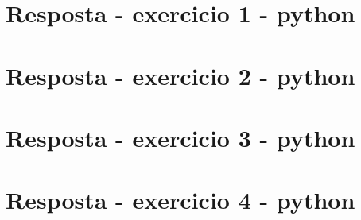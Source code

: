 \documentclass{article}
\begin{document}
\newpage
\section{Resposta - exercicio 1 - python}



\newpage

\section{Resposta - exercicio 2 - python}



\newpage
\section{Resposta - exercicio 3 - python}



\newpage 
\section{Resposta - exercicio 4 - python}

\end{document}
